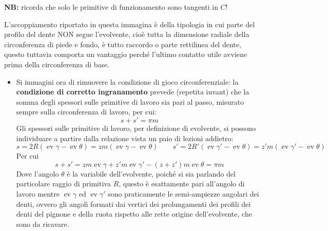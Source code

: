 \documentclass[a4paper, 15pt]{article}
\DeclareMathOperator{\ev}{ev}
\begin{document}
\begin{adjustwidth}{2in}{}
				\textbf{NB:} ricorda che solo le primitive di funzionamento sono tangenti in $C$!\newline
				
				L'accoppiamento riportato in questa immagina è della tipologia in cui parte del profilo del dente NON segue l'evolvente, cioè tutta la dimensione radiale della circonferenza di piede e fondo, è tutto raccordo o parte rettilinea del dente, questo tuttavia comporta un vantaggio perché l'ultimo contatto utile avviene prima della circonferenza di base. \newline 
				
				\begin{itemize}
				\item Si immagini ora di rimuovere la condizione di gioco circonferenziale: la \textbf{condizione di corretto ingranamento} prevede (repetita iuvant) che la somma degli spessori sulle primitive di lavoro sia pari al passo, misurato sempre sulla circonferenza di lavoro, per cui:
				\[s + s' = \pi m\]
				Gli spessori sulle primitive di lavoro, per definizione di evolvente, si possono individuare a partire dalla relazione vista un paio di lezioni addietro:
				\[s = 2R(\ev\gamma - \ev\theta) = zm(\ev\gamma - \ev\theta) \qquad s' = 2R'(\ev\gamma' - \ev\theta) = z'm(\ev\gamma' - \ev\theta)\]
				Per cui
				\[s + s' = zm\ev\gamma + z'm\ev\gamma' - (z+z')m\ev\theta = \pi m\]
				Dove l'angolo $\theta$ è la variabile dell'evolvente, poiché si sia parlando del particolare raggio di primitiva $R$, questo è esattamente pari all'angolo di lavoro mentre $\ev\gamma$ ed $\ev\gamma'$ sono praticamente le semi-ampiezze angolari dei denti, ovvero gli angoli formati dai vertici dei prolungamenti dei profili dei denti del pignone e della ruota rispetto alle rette origine dell'evolvente, che sono da ricavare.  \newline				
				

\end{itemize}
\end{adjustwidth}
\end{document}
